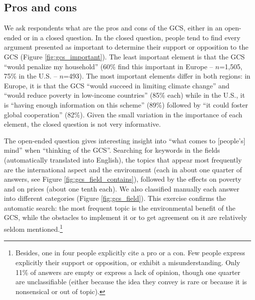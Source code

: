 \subsection{Pros and cons}
We ask respondents what are the pros and cons of the GCS, either in an open-ended or in a closed question. In the closed question, people tend to find every argument presented as important to determine their support or opposition to the GCS (Figure \ref{fig:gcs_important}). The least important element is that the GCS ``would penalize my household'' (60\% find this important in Europe -- $n$=1,505, 75\% in the U.S. -- $n$=493). The most important elements differ in both regions: in Europe, it is that the GCS ``would succeed in limiting climate change'' and ``would reduce poverty in low-income countries'' (85\% each) while in the U.S., it is ``having enough information on this scheme'' (89\%) followed by ``it could foster global cooperation'' (82\%). Given the small variation in the importance of each element, the closed question is not very informative. %

The open-ended question gives interesting insight into ``what comes to [people's] mind'' when ``thinking of the GCS''. Searching for keywords in the fields (automatically translated into English), the topics that appear most frequently are the international aspect and the environment (each in about one quarter of answers, see Figure \ref{fig:gcs_field_contains}), followed by the effects on poverty and on prices (about one tenth each). We also classified manually each answer into different categories (Figure \ref{fig:gcs_field}). This exercise confirms the automatic search: the most frequent topic is the environmental benefit of the GCS, while the obstacles to implement it or to get %
agreement on it are relatively seldom mentioned.\footnote{Besides, one in four people explicitly cite a pro or a con. Few people express explicitly their support or opposition, or exhibit a misunderstanding. Only 11\% of answers are empty or express a lack of opinion, though one quarter are unclassifiable (either because the idea they convey is rare or because it is nonsensical or out of topic).} %

